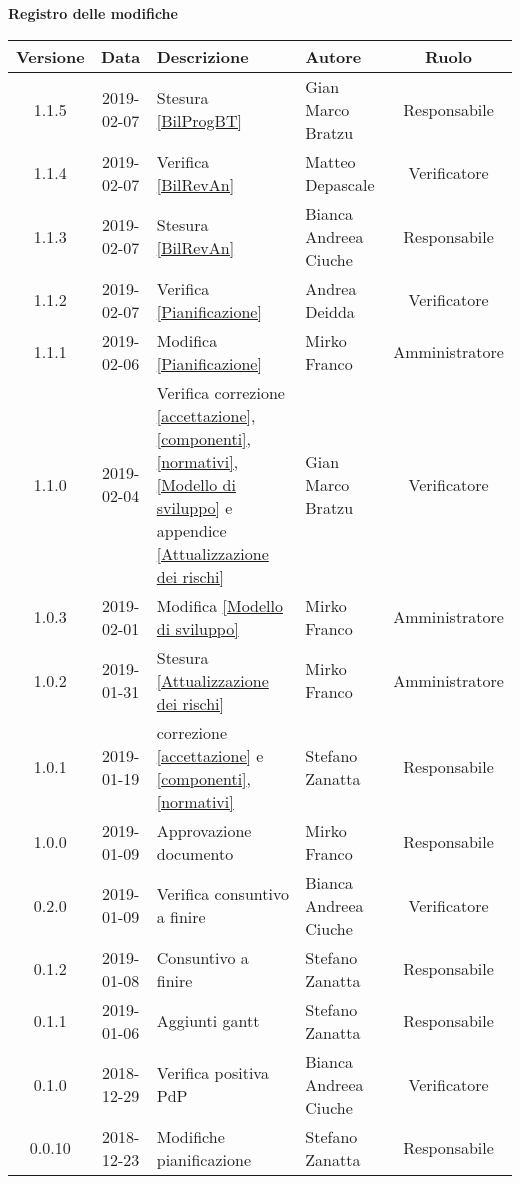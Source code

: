 	\begin{center}
		\textbf{Registro delle modifiche}
	\end{center}
	\begin{center}
		\begin{tabularx}{\textwidth}{|c|c|X|X|c|}
			\hline
			\textbf{Versione} & \textbf{Data} & \textbf{Descrizione} & \textbf{Autore} & \textbf{Ruolo} \\
			\hline
			
			
			1.1.5 & 2019-02-07 & Stesura \ref{BilProgBT} & Gian Marco Bratzu & Responsabile \\			
			\hline
			1.1.4 & 2019-02-07 & Verifica \ref{BilRevAn} & Matteo Depascale & Verificatore \\
			\hline			
			1.1.3 & 2019-02-07 & Stesura \ref{BilRevAn} & Bianca Andreea Ciuche & Responsabile \\
			\hline
			1.1.2 & 2019-02-07 & Verifica \ref{Pianificazione} & Andrea Deidda & Verificatore\\
			\hline
			1.1.1 & 2019-02-06 & Modifica \ref{Pianificazione} & Mirko Franco & Amministratore \\
			\hline
			1.1.0 & 2019-02-04 & Verifica correzione \ref{accettazione},  \ref{componenti}, \ref{normativi}, \ref{Modello di sviluppo} e appendice \ref{Attualizzazione dei rischi} & Gian Marco Bratzu & Verificatore\\
			\hline
			1.0.3 & 2019-02-01 & Modifica \ref{Modello di sviluppo} & Mirko Franco & Amministratore \\
			\hline
			1.0.2 & 2019-01-31 & Stesura \ref{Attualizzazione dei rischi} & Mirko Franco & Amministratore \\
			\hline
			1.0.1 & 2019-01-19 & correzione \ref{accettazione} e \ref{componenti},\ref{normativi} & Stefano Zanatta & Responsabile\\
			\hline
			1.0.0 & 2019-01-09 & Approvazione documento & Mirko Franco & Responsabile\\
			\hline
			0.2.0 & 2019-01-09 & Verifica consuntivo a finire & Bianca Andreea Ciuche& Verificatore\\
			\hline
			0.1.2 & 2019-01-08 & Consuntivo a finire & Stefano Zanatta & Responsabile\\
			\hline
			0.1.1 & 2019-01-06 & Aggiunti gantt & Stefano Zanatta & Responsabile\\
			\hline
			0.1.0 & 2018-12-29 & Verifica positiva PdP & Bianca Andreea Ciuche& Verificatore\\
			\hline
			0.0.10 & 2018-12-23 & Modifiche pianificazione & Stefano Zanatta & Responsabile\\

\end{tabularx}
\end{center}
